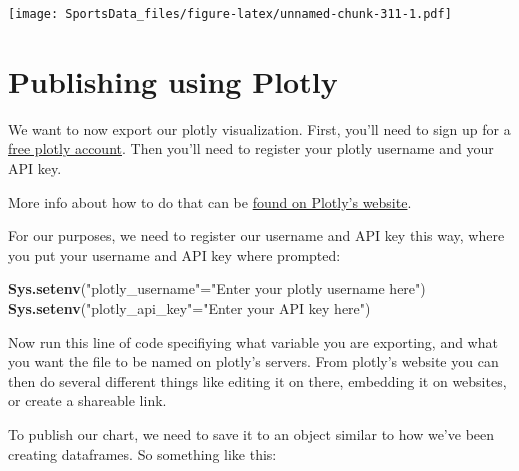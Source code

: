 \documentclass[
]{book}
\newenvironment{Shaded}{\begin{snugshade}}{\end{snugshade}}
\newcommand{\KeywordTok}[1]{\textcolor[rgb]{0.13,0.29,0.53}{\textbf{#1}}}
\newcommand{\NormalTok}[1]{#1}
\newcommand{\StringTok}[1]{\textcolor[rgb]{0.31,0.60,0.02}{#1}}
\begin{document}
\texttt{[image: SportsData\_files/figure-latex/unnamed-chunk-311-1.pdf]}

\hypertarget{publishing-using-plotly}{%
\section{Publishing using Plotly}\label{publishing-using-plotly}}

We want to now export our plotly visualization. First, you'll need to sign up for a \href{https://chart-studio.plotly.com/Auth/login/\#/}{free plotly account}. Then you'll need to register your plotly username and your API key.

More info about how to do that can be \href{https://plot.ly/r/getting-started/\#initialization-for-online-plotting}{found on Plotly's website}.

For our purposes, we need to register our username and API key this way, where you put your username and API key where prompted:

\begin{Shaded}
\begin{Highlighting}[]
\KeywordTok{Sys.setenv}\NormalTok{(}\StringTok{"plotly_username"}\NormalTok{=}\StringTok{"Enter your plotly username here"}\NormalTok{)}
\KeywordTok{Sys.setenv}\NormalTok{(}\StringTok{"plotly_api_key"}\NormalTok{=}\StringTok{"Enter your API key here"}\NormalTok{)}
\end{Highlighting}
\end{Shaded}

Now run this line of code specifiying what variable you are exporting, and what you want the file to be named on plotly's servers. From plotly's website you can then do several different things like editing it on there, embedding it on websites, or create a shareable link.

To publish our chart, we need to save it to an object similar to how we've been creating dataframes. So something like this:
\end{document}
